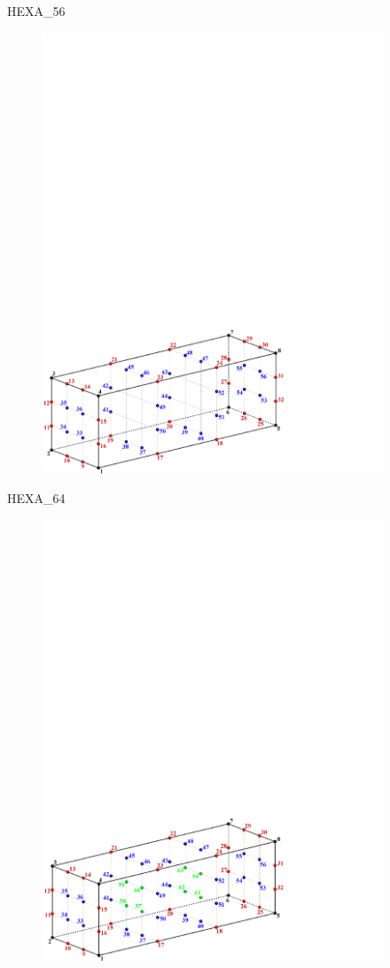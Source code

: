 {{{\bigskip

\newpage
HEXA\_56
\begin{figure}[!htb]
   \includegraphics[width=4in]{conv.figs/TecplotFiles_Cubic_Element/All_Figures/hex_56}
\end{figure}

HEXA\_64
\begin{figure}[!htb]
   \includegraphics[width=4in]{conv.figs/TecplotFiles_Cubic_Element/All_Figures/hex_64}
\end{figure}

}}}
